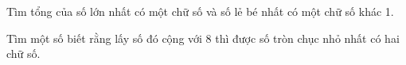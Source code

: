 \begin{ex} %
Tìm tổng của số lớn nhất có một chữ số và số lẻ bé nhất có một chữ số khác 1.
\end{ex}

\begin{ex} %
Tìm một số biết rằng lấy số đó cộng với 8 thì được số tròn chục nhỏ nhất có hai chữ số.
\end{ex}
